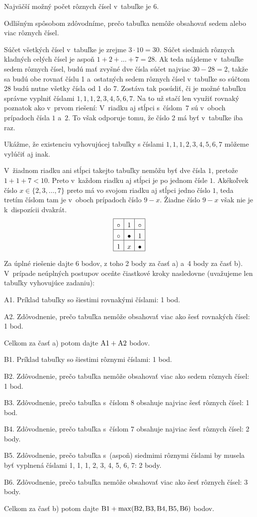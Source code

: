 {\zaver
Najväčší možný počet rôznych čísel v~tabuľke je 6.

\ineriesenie
Odlišným spôsobom zdôvodníme, prečo tabuľka nemôže
obsahovať sedem alebo viac rôznych čísel.

Súčet všetkých čísel v~tabuľke je zrejme $3\cdot10=30$. Súčet
siedmich {rôznych} kladných celých čísel je aspoň
$1+2+\ldots+7=28$. Ak teda nájdeme v~tabuľke
sedem rôznych čísel, {budú mať zvyšné dve čísla súčet
najviac $30-28=2$, takže sa budú obe rovnať číslu 1 a~ostatných
sedem rôznych čísel v~tabuľke so súčtom 28 budú nutne všetky
čísla od 1 do 7.}
Zostáva tak posúdiť, či je možné tabuľku správne vyplniť
číslami $1,1,1,2,3,4,5,6,7$. Na to už stačí len využiť
rovnaký poznatok ako v~prvom riešení:
V~riadku aj stĺpci s~číslom~$7$ sú v~oboch prípadoch
čísla $1$ a~$2$. To však odporuje tomu, že číslo 2
má byť v~tabuľke iba raz.

\poznamka
Ukážme, že existenciu vyhovujúcej tabuľky s číslami
$1,1,1,2,3,4,5,6,7$ môžeme vylúčiť aj inak.

V~žiadnom riadku ani stĺpci takejto tabuľky nemôžu byť dve čísla
$1$, pretože $1+1+7<10$. Preto v~každom riadku aj stĺpci je po
jednom čísle $1$. Akékoľvek číslo $x\in\{2,3,\dots,7\}$
preto má vo svojom riadku aj stĺpci jedno číslo $1$, teda
tretím číslom tam je v~oboch prípadoch číslo $9-x$.
Žiadne číslo $9-x$ však nie je k~dispozícii dvakrát.
$$\vbox{\def\pol#1{\hbox to 15 bp{\hss$#1$\hss}\vrule}%
\halign{\vrule height12bp depth 3bp\pol#&&\pol#\cr
\noalign{\hrule}
\circ & 1 & \circ \cr\noalign{\hrule}
\circ & {\bullet} & 1 \cr\noalign{\hrule}
1 & x & {\bullet} \cr\noalign{\hrule}
}}$$


\schemaABC
Za úplné riešenie dajte 6 bodov, z toho 2 body za časť a) a~4 body
za časť b). V~prípade neúplných postupov oceňte
čiastkové kroky nasledovne (uvažujeme len tabuľky vyhovujúce zadaniu):

\smallskip
\item{A1.} Príklad tabuľky so šiestimi rovnakými číslami: 1 bod.
\item{A2.} Zdôvodnenie, prečo tabuľka nemôže obsahovať viac ako šesť rovnakých čísel: 1 bod.

\smallskip\noindent
Celkom za časť a) potom dajte $\rm A1+A2$ bodov.

\smallskip
\item{B1.} Príklad tabuľky so šiestimi rôznymi číslami: 1 bod.
\item{B2.} Zdôvodnenie, prečo tabuľka nemôže obsahovať viac ako sedem rôznych čísel: 1 bod.
\item{B3.} Zdôvodnenie, prečo tabuľka s~číslom 8 obsahuje najviac šesť rôznych čísel: 1 bod.
\item{B4.} Zdôvodnenie, prečo tabuľka s~číslom 7 obsahuje najviac šesť rôznych čísel: 2 body.
\item{B5.} Zdôvodnenie, prečo tabuľka s~(aspoň) siedmimi rôznymi číslami by musela byť vyplnená číslami 1, 1, 1, 2, 3, 4, 5, 6, 7: 2 body.
\item{B6.} Zdôvodnenie, prečo tabuľka nemôže obsahovať viac ako šesť rôznych čísel: 3 body.

\smallskip\noindent
Celkom za časť b) potom dajte $\rm B1+\max(B2,B3,B4,B5,B6)$ bodov.\endschema
}

